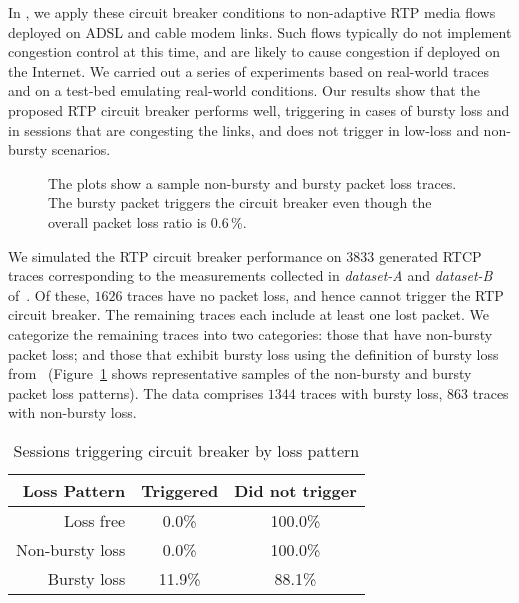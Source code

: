 In , we apply these circuit breaker conditions to non-adaptive
RTP media flows deployed on ADSL and cable modem links.  Such flows typically
do not implement congestion control at this time, and are likely to cause
congestion if deployed on the Internet. We carried out a series of experiments
based on real-world traces and on a test-bed emulating real-world conditions.
Our results show that the proposed RTP circuit breaker performs well,
triggering in cases of bursty loss and in sessions that are congesting the
links, and does not trigger in low-loss and non-bursty scenarios.

\begin{figure}
  \centerline{
  }
  \caption{The plots show a sample non-bursty and bursty packet loss traces.
  The bursty packet triggers the circuit breaker even though the overall
  packet loss ratio is 0.6\,\%.}
  \label{fig:4:bursty}
\end{figure}

We simulated the RTP circuit breaker performance on $3833$ generated RTCP traces
corresponding to the measurements collected in \emph{dataset-A} and
\emph{dataset-B} of~\cite{ellis:2011:dataset}. Of these, $1626$ traces have no
packet loss, and hence cannot trigger the RTP circuit breaker. The remaining
traces each include at least one lost packet. We categorize the remaining
traces into two categories: those that have non-bursty packet loss; and those
that exhibit bursty loss using the definition of bursty loss
from~\cite{rfc3611} (Figure~\ref{fig:4:bursty} shows representative samples of
the non-bursty and bursty packet loss patterns). The data comprises $1344$
traces with bursty loss, $863$ traces with non-bursty loss.

\begin{table}
  \begin{center}
    \begin{tabular}{rcc}
    \toprule
    Loss Pattern       & Triggered & Did not trigger \\
    \midrule
             Loss free &   0.0\% & 100.0\% \\
       Non-bursty loss &   0.0\% & 100.0\% \\
          Bursty loss  &  11.9\% &  88.1\% \\
    \bottomrule
    \end{tabular}
    \caption{Sessions triggering circuit breaker by loss pattern}
    \label{tab:4:cb_bursty}
  \end{center}
\end{table}



